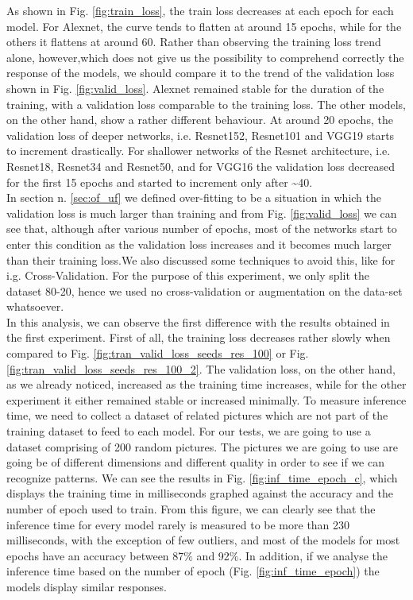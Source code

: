 As shown in Fig. \ref{fig:train_loss}, the train loss decreases at each epoch for each model. For Alexnet, the curve tends to flatten at around 15 epochs, while for the others it flattens at around 60. Rather than observing the training loss trend alone, however,which does not give us the possibility to comprehend correctly the response of the models, we should compare it to the trend of the validation loss shown in Fig. \ref{fig:valid_loss}. Alexnet remained stable for the duration of the training, with a validation loss comparable to the training loss. The other models, on the other hand, show a rather different behaviour. At around 20 epochs, the validation loss of deeper networks, i.e. Resnet152, Resnet101 and VGG19 starts to increment drastically. For shallower networks of the Resnet architecture, i.e. Resnet18, Resnet34 and Resnet50, and for VGG16 the validation loss decreased for the first 15 epochs and started to increment only after \textasciitilde40.\\
In section n. \ref{sec:of_uf} we defined over-fitting to be a situation in which the validation loss is much larger than training and from Fig. \ref{fig:valid_loss} we can see that, although after various number of epochs, most of the networks start to enter this condition as the validation loss increases and it becomes much larger than their training loss.We also discussed some techniques to avoid this, like for i.g. Cross-Validation. For the purpose of this experiment, we only split the dataset 80-20, hence we used no cross-validation or augmentation on the data-set whatsoever. \\
In this analysis, we can observe the first difference with the results obtained in the first experiment. First of all, the training loss decreases rather slowly when compared to Fig. \ref{fig:tran_valid_loss_seeds_res_100} or Fig.  \ref{fig:tran_valid_loss_seeds_res_100_2}. The validation loss, on the other hand, as we already noticed, increased as the training time increases, while for the other experiment it either remained stable or increased minimally.
To measure inference time, we need to collect a dataset of related pictures which are not part of the training dataset to feed to each model. For our tests, we are going to use a dataset comprising of 200 random pictures. The pictures we are going to use are going be of different dimensions and different quality in order to see if we can recognize patterns. We can see the results in Fig. \ref{fig:inf_time_epoch_c}, which displays the training time in milliseconds graphed against the accuracy and the number of epoch used to train. From this figure, we can clearly see that the inference time for every model rarely is measured to be more than 230 milliseconds, with the exception of few outliers, and most of the models for most epochs have an accuracy between 87\% and 92\%. In addition, if we analyse the inference time based on the number of epoch (Fig. \ref{fig:inf_time_epoch}) the models display similar responses.  \\


